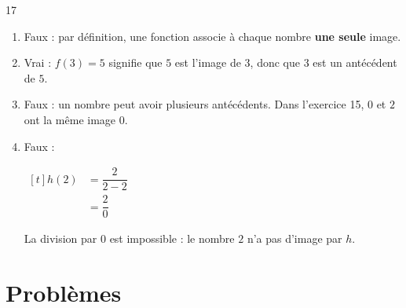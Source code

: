 \documentclass[10pt,a4paper]{article}
\begin{document}
\begin{corr}{17}
\begin{enumerate}[leftmargin=*]
    \item Faux : par définition, une fonction associe à chaque nombre \textbf{une seule} image.
    \item Vrai : \(f(3)=5\) signifie que \(5\) est l'image de \(3\), donc que \(3\) est un antécédent de \(5\).
    \item Faux : un nombre peut avoir plusieurs antécédents. Dans l'exercice 15, \(0\) et \(2\) ont la même image \(0\).
    \item Faux :

    \(\begin{aligned}[t] h(2)&=\dfrac{2}{2-2}\\ &=\dfrac{2}{0}\end{aligned}\)

    La division par \(0\) est impossible : le nombre \(2\) n'a pas d'image par \(h\).
\end{enumerate}
\end{corr}

\section{Problèmes}
\end{document}
